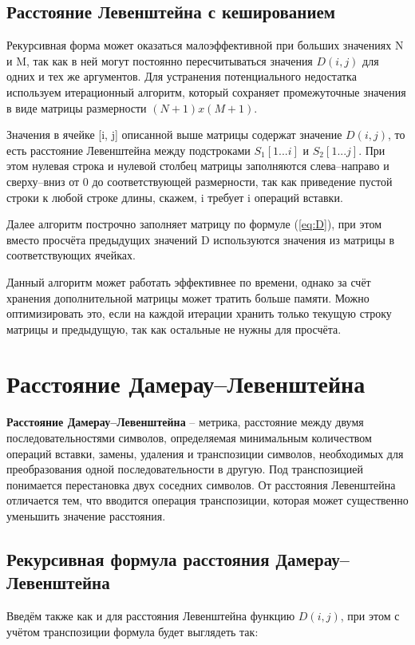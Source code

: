 \subsection{Расстояние Левенштейна с кешированием}
Рекурсивная форма может оказаться малоэффективной при больших значениях N и M, так как в ней могут постоянно пересчитываться значения $D(i, j)$ для одних и тех же аргументов. Для устранения потенциального недостатка используем итерационный алгоритм, который сохраняет промежуточные значения в виде матрицы размерности $(N+1)x(M+1)$.

Значения в ячейке [i, j] описанной выше матрицы содержат значение $D(i, j)$, то есть расстояние Левенштейна между подстроками $S_1[1...i]$ и $S_2[1...j]$.
При этом нулевая строка и нулевой столбец матрицы заполняются слева–направо и сверху–вниз от 0 до соответствующей размерности,  так как приведение пустой строки к любой строке длины, скажем, i требует i операций вставки.

Далее алгоритм построчно заполняет матрицу по формуле (\ref{eq:D}), при этом вместо просчёта предыдущих значений D используются значения из матрицы в соответствующих ячейках.

Данный алгоритм может работать эффективнее по времени, однако за счёт хранения дополнительной матрицы может тратить больше памяти. Можно оптимизировать это, если на каждой итерации хранить только текущую строку матрицы и предыдущую, так как остальные не нужны для просчёта.

\section{Расстояние Дамерау–Левенштейна}

\textbf{Расстояние Дамерау–Левенштейна} – метрика, расстояние между двумя последовательностями символов, определяемая минимальным количеством операций вставки, замены, удаления и транспозиции символов, необходимых для преобразования одной последовательности в другую. Под транспозицией понимается перестановка двух соседних символов. От расстояния Левенштейна отличается тем, что вводится операция транспозиции, которая может существенно уменьшить значение расстояния.

\subsection{Рекурсивная формула расстояния Дамерау–Левенштейна}

Введём также как и для расстояния Левенштейна функцию $D(i, j)$, при этом с учётом транспозиции формула будет выглядеть так:

